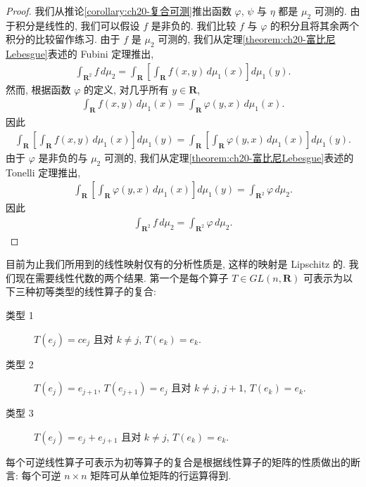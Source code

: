 \documentclass[../../main.tex]{subfiles}
\begin{document}
\begin{proof}
我们从推论\cref{corollary:ch20-复合可测}推出函数 $\varphi$, $\psi$ 与 $\eta$ 都是 $\mu_{2}$ 可测的. 由于积分是线性的, 我们可以假设 $f$ 是非负的. 我们比较 $f$ 与 $\varphi$ 的积分且将其余两个积分的比较留作练习. 由于 $f$ 是 $\mu_{2}$ 可测的, 我们从定理\cref{theorem:ch20-富比尼Lebesgue}表述的 Fubini 定理推出,
\begin{align*}
\int_{\mathbf{R}^{2}}f\,d\mu_{2}=\int_{\mathbf{R}}\left[\int_{\mathbf{R}}f(x,y)\,d\mu_{1}(x)\right]d\mu_{1}(y).
\end{align*}
然而, 根据函数 $\varphi$ 的定义, 对几乎所有 $y\in\mathbf{R}$,
\begin{align*}
\int_{\mathbf{R}}f(x,y)\,d\mu_{1}(x)=\int_{\mathbf{R}}\varphi(y,x)\,d\mu_{1}(x).
\end{align*}
因此
\begin{align*}
\int_{\mathbf{R}}\left[\int_{\mathbf{R}}f(x,y)\,d\mu_{1}(x)\right]d\mu_{1}(y)=\int_{\mathbf{R}}\left[\int_{\mathbf{R}}\varphi(y,x)\,d\mu_{1}(x)\right]d\mu_{1}(y).
\end{align*}
由于 $\varphi$ 是非负的与 $\mu_{2}$ 可测的, 我们从定理\cref{theorem:ch20-富比尼Lebesgue}表述的 Tonelli 定理推出,
\begin{align*}
\int_{\mathbf{R}}\left[\int_{\mathbf{R}}\varphi(y,x)\,d\mu_{1}(x)\right]d\mu_{1}(y)=\int_{\mathbf{R}^{2}}\varphi\,d\mu_{2}.
\end{align*}
因此
\begin{align*}
\int_{\mathbf{R}^{2}}f\,d\mu_{2}=\int_{\mathbf{R}^{2}}\varphi\,d\mu_{2}.
\end{align*}
\end{proof}

目前为止我们所用到的线性映射仅有的分析性质是, 这样的映射是 Lipschitz 的. 我们现在需要线性代数的两个结果. 第一个是每个算子 $T\in GL(n,\mathbf{R})$ 可表示为以下三种初等类型的线性算子的复合:
\begin{description}
\item[类型 1] $T(e_{j})=ce_{j}$ 且对 $k\neq j$, $T(e_{k})=e_{k}$.
\item[类型 2] $T(e_{j})=e_{j+1}$, $T(e_{j+1})=e_{j}$ 且对 $k\neq j$, $j+1$, $T(e_{k})=e_{k}$.
\item[类型 3] $T(e_{j})=e_{j}+e_{j+1}$ 且对 $k\neq j$, $T(e_{k})=e_{k}$.
\end{description}
每个可逆线性算子可表示为初等算子的复合是根据线性算子的矩阵的性质做出的断言: 每个可逆 $n\times n$ 矩阵可从单位矩阵的行运算得到.
\end{document}
